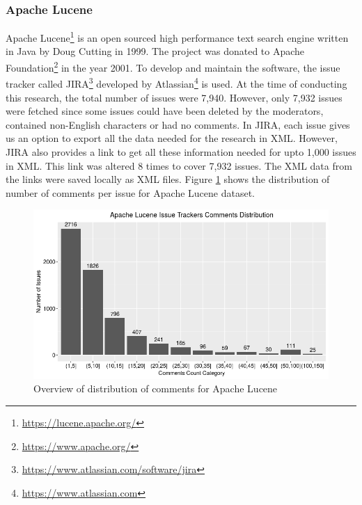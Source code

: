 \documentclass[a4paper,12pt,twoside]{report}
\begin{document}
\subsubsection{Apache Lucene}
Apache Lucene\footnote{\url{https://lucene.apache.org/}} is an open sourced high performance text search engine written in Java by Doug Cutting in 1999. The project was donated to Apache Foundation\footnote{\url{https://www.apache.org/}} in the year 2001. To develop and maintain the software, the issue tracker called JIRA\footnote{\url{https://www.atlassian.com/software/jira}} developed by Atlassian\footnote{\url{https://www.atlassian.com}} is used. At the time of conducting this research, the total number of issues were 7,940. However, only 7,932 issues were fetched since some issues could have been deleted by the moderators, contained non-English characters or had no comments.
\newline \newline
In JIRA, each issue gives us an option to export all the data needed for the research in XML. However, JIRA also provides a link to get all these information needed for upto 1,000 issues in XML. This link was altered 8 times to cover 7,932 issues. The XML data from the links were saved locally as XML files. Figure \ref{fig:luceneRawDistro} shows the distribution of number of comments per issue for Apache Lucene dataset. 
\begin{figure}[h] %
    \centering
    \includegraphics[width=12cm]{lucene-comment-distribution-raw}
    \caption{Overview of distribution of comments for Apache Lucene}
    \label{fig:luceneRawDistro}
\end{figure}
\end{document}
